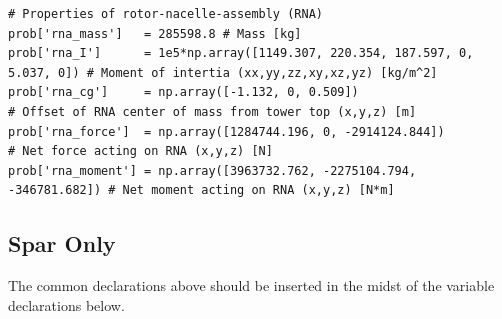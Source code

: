 \begin{lstlisting}
# Properties of rotor-nacelle-assembly (RNA)
prob['rna_mass']   = 285598.8 # Mass [kg]
prob['rna_I']      = 1e5*np.array([1149.307, 220.354, 187.597, 0, 5.037, 0]) # Moment of intertia (xx,yy,zz,xy,xz,yz) [kg/m^2]
prob['rna_cg']     = np.array([-1.132, 0, 0.509])                       # Offset of RNA center of mass from tower top (x,y,z) [m]
prob['rna_force']  = np.array([1284744.196, 0, -2914124.844])           # Net force acting on RNA (x,y,z) [N]
prob['rna_moment'] = np.array([3963732.762, -2275104.794, -346781.682]) # Net moment acting on RNA (x,y,z) [N*m]
\end{lstlisting}

\subsection{Spar Only}
The common declarations above should be inserted in the midst of the
variable declarations below.

